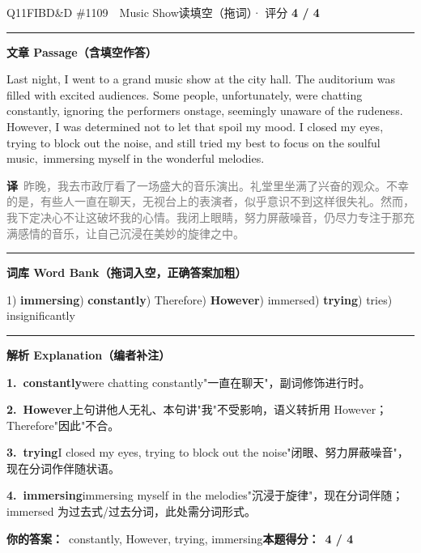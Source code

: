 \documentclass[11pt]{article}
\newcommand{\ptesub}[1]{%
  \par\needspace{2\baselineskip}\smallskip
  {\color{cAccent}\rule[-0.2ex]{3pt}{1.05em}}\hspace{6pt}%
  {\bfseries\color{cHead}#1}\par\nopagebreak\smallskip}
\newcommand{\zh}[1]{{\footnotesize\textcolor{cNote}{\textbf{译}}\ \textcolor{gray}{#1}}}
\newcommand{\rok}[1]{{\color{cFix}\ding{51}\,#1}}                 %
\begin{document}
\begin{qblock}{Q11\quad FIBD\&D \#1109\ \ Music Show}{读填空（拖词）· 评分 \textcolor{cAccent}{\bfseries 4 / 4}}
\ptesub{文章 Passage（含填空作答）}
\begin{promptbox}
Last night, I went to a grand music show at the city hall. The auditorium was filled with excited audiences. Some people, unfortunately, were chatting \rok{constantly}, ignoring the performers onstage, seemingly unaware of the rudeness. \rok{However}, I was determined not to let that spoil my mood. I closed my eyes, \rok{trying} to block out the noise, and still tried my best to focus on the soulful music, \rok{immersing} myself in the wonderful melodies.
\end{promptbox}
\zh{昨晚，我去市政厅看了一场盛大的音乐演出。礼堂里坐满了兴奋的观众。不幸的是，有些人一直在聊天，无视台上的表演者，似乎意识不到这样很失礼。然而，我下定决心不让这破坏我的心情。我闭上眼睛，努力屏蔽噪音，仍尽力专注于那充满感情的音乐，让自己沉浸在美妙的旋律之中。}
\ptesub{词库 Word Bank（拖词入空，正确答案加粗）}
{\small 1) \textbf{immersing}) \textbf{constantly}) Therefore) \textbf{However}) immersed) \textbf{trying}) tries) insignificantly}
\ptesub{解析 Explanation（编者补注）}
\begin{notebox}\footnotesize
\textbf{1.\ constantly}\quad were chatting constantly"一直在聊天"，副词修饰进行时。\par\smallskip
\textbf{2.\ However}\quad 上句讲他人无礼、本句讲"我"不受影响，语义转折用 However；Therefore"因此"不合。\par\smallskip
\textbf{3.\ trying}\quad I closed my eyes, trying to block out the noise"闭眼、努力屏蔽噪音"，现在分词作伴随状语。\par\smallskip
\textbf{4.\ immersing}\quad immersing myself in the melodies"沉浸于旋律"，现在分词伴随；immersed 为过去式/过去分词，此处需分词形式。
\end{notebox}
\smallskip
\textbf{你的答案：}\ constantly, However, trying, immersing\qquad\textbf{本题得分：}\ {\color{cAccent}\bfseries 4 / 4}
\end{qblock}
\end{document}
